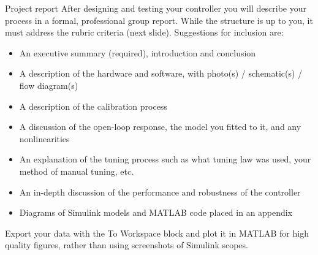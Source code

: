 \documentclass[9pt]{beamer-control}
\begin{document}

\begin{frame}{Project report}
  After designing and testing your controller you will describe your process in a formal, professional group report. While the structure is up to you, it must address the rubric criteria (next slide). Suggestions for inclusion are:
  \begin{itemize}
    \item An executive summary (required), introduction and conclusion
    \item A description of the hardware and software, with photo(s) / schematic(s) / flow diagram(s)
    \item A description of the calibration process
    \item A discussion of the open-loop response, the model you fitted to it, and any nonlinearities
    \item An explanation of the tuning process such as what tuning law was used, your method of manual tuning, etc.
    \item An in-depth discussion of the performance and robustness of the controller
    \item Diagrams of Simulink models and MATLAB code placed in an appendix
  \end{itemize}
  Export your data with the \textsf{To Workspace} block and plot it in MATLAB for high quality figures, rather than using screenshots of Simulink scopes.
\end{frame}
\end{document}
